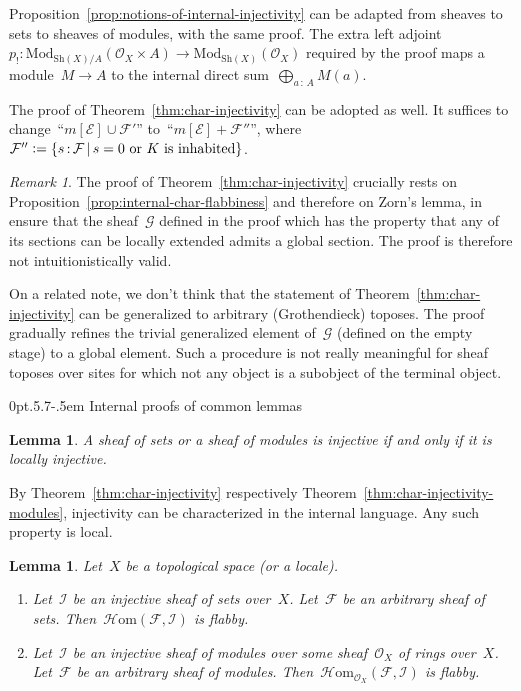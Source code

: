 \documentclass[10pt,reqno,a4paper]{amsbook}
\makeatletter
\theoremstyle{definition}
\theoremstyle{plain}
\newtheorem{lemma}[defn]{Lemma}
\theoremstyle{remark}
\newtheorem{rem}[defn]{Remark}
\newcommand{\E}{\mathcal{E}}
\newcommand{\F}{\mathcal{F}}
\renewcommand{\G}{\mathcal{G}}
\renewcommand{\O}{\mathcal{O}}
\newcommand{\I}{\mathcal{I}}
\newcommand{\HOM}{\mathcal{H}\mathrm{om}}
\newcommand{\Sh}{\mathrm{Sh}}
\newcommand{\Mod}{\mathrm{Mod}}
\newcommand{\?}{\,{:}\,}
\renewcommand{\_}{\mathpunct{.}\,}
\newcommand{\defeq}{\vcentcolon=}
\renewenvironment{proof}[1][\proofname]{\par
  \pushQED{\qed}%
  \normalfont \topsep6\p@\@plus6\p@\relax
  \trivlist
  \item[\hskip\labelsep
        \itshape
    #1\@addpunct{.}]\ignorespaces
}{%
  \popQED\endtrivlist\@endpefalse
}
\def\subsection{\@startsection{subsection}{2}%
  {0pt}{.5\linespacing\@plus.7\linespacing}{-.5em}%
  {\normalfont\bfseries}}
\makeatother
\begin{document}
\begin{proof}Proposition~\ref{prop:notions-of-internal-injectivity} can be
adapted from sheaves to sets to sheaves of modules, with the same proof.
The extra left adjoint~$p_! : \Mod_{\Sh(X)/A}(\O_X \times A) \to
\Mod_{\Sh(X)}(\O_X)$ required by the proof maps a module~$M \to A$ to the
internal direct sum~$\bigoplus_{a \? A} M(a)$.

The proof of Theorem~\ref{thm:char-injectivity} can be adopted as well.
It suffices to change~``$m[\E] \cup \F'$'' to~``$m[\E] + \F''$'', where~$\F''
\defeq \{ s \? \F \,|\, \text{$s = 0$ or $K$ is inhabited} \}$.
\end{proof}

\begin{rem}The proof of Theorem~\ref{thm:char-injectivity} crucially rests on
Proposition~\ref{prop:internal-char-flabbiness} and therefore on Zorn's lemma,
in ensure that the sheaf~$\G$ defined in the proof which has the property that
any of its sections can be locally extended admits a global section. The proof
is therefore not intuitionistically valid.

On a related note, we don't think that the statement of
Theorem~\ref{thm:char-injectivity} can be generalized to arbitrary
(Grothendieck) toposes. The proof gradually refines the trivial
generalized element of~$\G$ (defined on the empty stage) to a global element.
Such a procedure is not really meaningful for sheaf toposes over sites for
which not any object is a subobject of the terminal object.
\end{rem}


\subsection{Internal proofs of common lemmas}

\begin{lemma}A sheaf of sets or a sheaf of modules is injective if and only if it
is locally injective.\end{lemma}

\begin{proof}By Theorem~\ref{thm:char-injectivity} respectively
Theorem~\ref{thm:char-injectivity-modules}, injectivity can be characterized in the
internal language. Any such property is local.\end{proof}

\begin{lemma}Let~$X$ be a topological space (or a locale).
\begin{enumerate}
\item Let~$\I$ be an injective sheaf of sets over~$X$. Let~$\F$ be an arbitrary
sheaf of sets. Then~$\HOM(\F,\I)$ is flabby.
\item Let~$\I$ be an injective sheaf of modules over some sheaf~$\O_X$ of rings
over~$X$. Let~$\F$ be an arbitrary sheaf of modules.
Then~$\HOM_{\O_X}(\F,\I)$ is flabby.
\end{enumerate}
\end{lemma}
\end{document}
